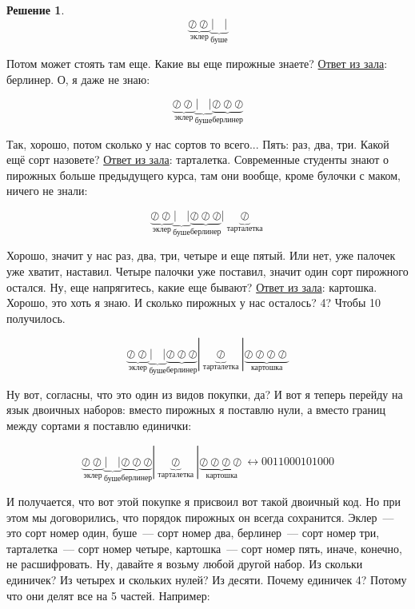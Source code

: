 \documentclass[russian]{lecture-notes}
\theoremstyle{definition}
\newtheorem*{solution}{Решение}
\begin{document}
\begin{enumerate}
\begin{solution}
			\[
				\underbrace{\oslash \oslash}_{\text{эклер}}  \underbrace{| \ \ \ \ |}_{\text{буше}}
			\]
			
			Потом может стоять там еще. Какие вы еще пирожные знаете? \underline{Ответ из зала}: берлинер. О, я даже не знаю:
			
			\[
				\underbrace{\oslash \oslash}_{\text{эклер}}  \underbrace{| \ \ \ \ |}_{\text{буше}} \underbrace{\oslash \oslash \oslash}_{\text{берлинер}}
			\]
			
			Так, хорошо, потом сколько у нас сортов то всего... Пять: раз, два, три. Какой ещё сорт назовете? \underline{Ответ из зала}: тарталетка. Современные студенты знают о пирожных больше предыдущего курса, там они вообще, кроме булочки с маком, ничего не знали:
			
			\[
				\underbrace{\oslash \oslash}_{\text{эклер}}  \underbrace{| \ \ \ \ |}_{\text{буше}} \underbrace{\oslash \oslash \oslash}_{\text{берлинер}} | \underbrace{\oslash}_{\text{тарталетка}}
			\]
			
			Хорошо, значит у нас раз, два, три, четыре и еще пятый. Или нет, уже палочек уже хватит, наставил. Четыре палочки уже поставил, значит один сорт пирожного остался. Ну, еще напрягитесь, какие еще бывают? \underline{Ответ из зала}: картошка. Хорошо, это хоть я знаю. И сколько пирожных у нас осталось? 4? Чтобы 10 получилось.
			
			\[
				\underbrace{\oslash \oslash}_{\text{эклер}}  \underbrace{| \ \ \ \ |}_{\text{буше}} \underbrace{\oslash \oslash \oslash}_{\text{берлинер}} | \underbrace{\oslash}_{\text{тарталетка}} | \underbrace{\oslash \oslash \oslash \oslash}_{\text{картошка}}
			\]
			
			Ну вот, согласны, что это один из видов покупки, да? И вот я теперь перейду на язык двоичных наборов: вместо пирожных я поставлю нули, а вместо границ между сортами я поставлю единички:
			
			\[
				\underbrace{\oslash \oslash}_{\text{эклер}}  \underbrace{| \ \ \ \ |}_{\text{буше}} \underbrace{\oslash \oslash \oslash}_{\text{берлинер}} | \underbrace{\oslash}_{\text{тарталетка}} | \underbrace{\oslash \oslash \oslash \oslash}_{\text{картошка}} \longleftrightarrow 0011000101000
			\]
			
			И получается, что вот этой покупке я присвоил вот такой двоичный код. Но при этом мы договорились, что порядок пирожных он всегда сохранится. Эклер~--- это сорт номер один, буше~--- сорт номер два, берлинер~--- сорт номер три, тарталетка~--- сорт номер четыре, картошка~--- сорт номер пять, иначе, конечно, не расшифровать. Ну, давайте я возьму любой другой набор. Из скольки единичек? Из четырех и скольких нулей? Из десяти. Почему единичек 4? Потому что они делят все на 5 частей. Например:
			

\end{solution}
\end{enumerate}
\end{document}
